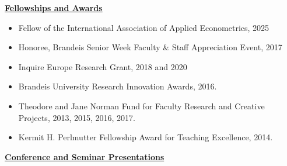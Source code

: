 \documentclass[12pt]{article}
\begin{document}
\underline{\textbf{Fellowships and Awards}}
\begin{itemize}
\item Fellow of the International Association of Applied Econometrics, 2025	
\item Honoree, Brandeis Senior Week Faculty \& Staff Appreciation Event, 2017	 
\item Inquire Europe Research Grant, 2018 and 2020
\item Brandeis University Research Innovation Awards, 2016. 
\item Theodore and Jane Norman Fund for Faculty Research and Creative Projects, 2013, 2015, 2016, 2017. 
\item Kermit H. Perlmutter Fellowship Award for Teaching Excellence, 2014. 
\end{itemize}
\underline{\textbf{Conference and Seminar Presentations}}
\end{document}
